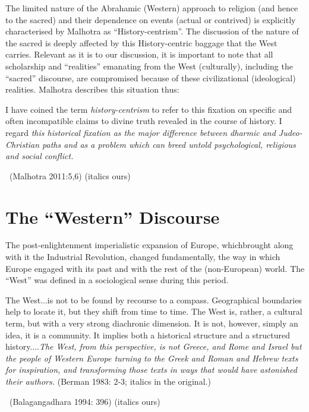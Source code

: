 The limited nature of the Abrahamic (Western) approach to religion (and hence to the sacred) and their dependence on events (actual or contrived) is explicitly characterised by Malhotra as “History-centrism”. The discussion of the nature of the sacred is deeply affected by this History-centric baggage that the West carries. Relevant as it is to our discussion, it is important to note that all scholarship and “realities” emanating from the West (culturally), including the “sacred” discourse, are compromised because of these civilizational (ideological) realities. Malhotra describes this situation thus:

\begin{myquote}
I have coined the term \textit{history-centrism} to refer to this fixation on specific and often incompatible claims to divine truth revealed in the course of history. I regard \textit{this historical fixation as the major difference between dharmic and Judeo-Christian paths and as a problem which can breed untold psychological, religious and social conflict.} 

~\hfill (Malhotra 2011:5,6) (italics ours)
\end{myquote}


\section*{The “Western” Discourse}

The post-enlightenment imperialistic expansion of Europe, which\break brought along with it the Industrial Revolution, changed fundamentally, the way in which Europe engaged with its past and with the rest of the (non-European) world. The “West” was defined in a sociological sense during this period.

\begin{myquote}
The West...is not to be found by recourse to a compass. Geographical boundaries help to locate it, but they shift from time to time. The West is, rather, a cultural term, but with a very strong diachronic dimension. It is not, however, simply an idea, it is a community. It implies both a historical structure and a structured history....\textit{The West, from this perspective, is not Greece, and Rome and Israel but the people of Western Europe turning to the Greek and Roman and Hebrew texts for inspiration, and transforming those texts in ways that would have astonished their authors.} (Berman 1983: 2-3; italics in the original.) 

~\hfill (Balagangadhara 1994: 396) (italics ours)
\end{myquote}

